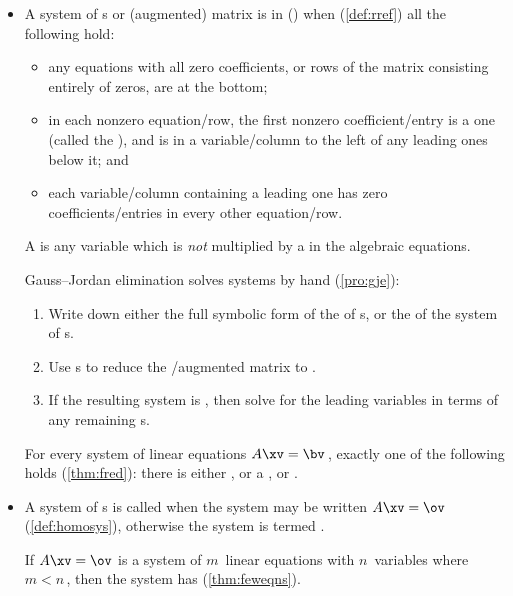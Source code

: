 \begin{itemize}
\item A system of s or (augmented) matrix is in  (\rref) when (\autoref{def:rref}) all the following hold:
  \begin{itemize}
\item any equations with all zero coefficients, or rows of the matrix consisting entirely of zeros, are at the bottom; 
\item in each nonzero equation\slash row, the first nonzero coefficient\slash entry is a one (called the ), and is in a variable\slash column to the left of any leading ones below it;
and
\item each variable\slash column containing a leading one has zero coefficients\slash entries in every other equation\slash row.\end{itemize}
A  is any variable which is \emph{not} multiplied by a  in the algebraic equations.

\itemme Gauss--Jordan elimination solves systems by hand (\autoref{pro:gje}):
\begin{enumerate}
\item Write down either the full symbolic form of the  of s, or the  of the system of s.
\item Use s to reduce the \slash{augmented matrix} to .
\item If the resulting system is , then solve for the leading variables in terms of any remaining s.
\end{enumerate}

\itemhi For every system of linear equations \(A\xv=\bv\)\,, exactly one of the following holds (\autoref{thm:fred}): there is either , or a , or .

\item A system of s is called  when the system may be written \(A\xv=\ov\) (\autoref{def:homosys}),
otherwise the system is termed .

\itemme If \(A\xv=\ov\) is a  system of \(m\)~{linear equation}s with \(n\)~variables where \(m<n\)\,, then the system has  (\autoref{thm:feweqns}).




\end{itemize}
